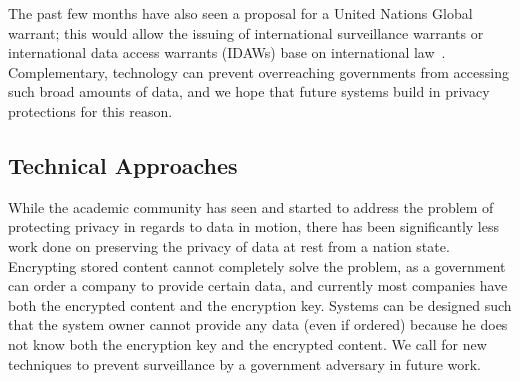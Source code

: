 The past few months have also seen a proposal for a United Nations Global warrant; this would allow the issuing of international surveillance warrants or international data access warrants (IDAWs) base on international law~\cite{global_warrant}.  Complementary, technology can prevent overreaching governments from accessing such broad amounts of data, and we hope that future systems build in privacy protections for this reason. 


\subsection{Technical Approaches}
\label{sec:tech_rest}
While the academic community has seen and started to address the problem of protecting privacy in regards to data in motion, there has been significantly less work done on preserving the privacy of data at rest from a nation state.  Encrypting stored content cannot completely solve the problem, as a government can order a company to provide certain data, and currently most companies have both the encrypted content and the encryption key.  Systems can be designed such that the system owner cannot provide any data (even if ordered) because he does not know both the encryption key and the encrypted content.  We call for new techniques to prevent surveillance by a government adversary in future work.



